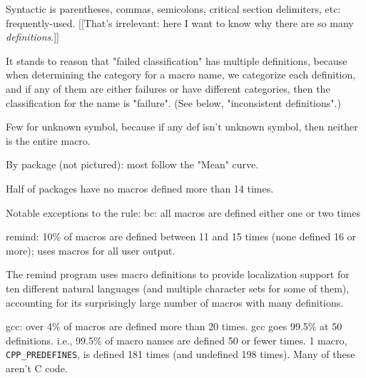 \documentclass[10pt]{article}
\newcommand{\pkg}[1]{\textsf{#1}}
\begin{document}
        Syntactic is parentheses, commas, semicolons, critical section
          delimiters, etc:  frequently-used.  [[That's irrelevant:  here I
          want to know why there are so many {\em definitions}.]]

        It stands to reason that "failed classification" has multiple
          definitions, because when determining the category for a macro
          name, we categorize each definition, and if any of them are
          either failures or have different categories, then the classification
          for the name is "failure".  (See below, "inconsistent definitions".)

        Few for unknown symbol, because if any def isn't unknown symbol,
          then neither is the entire macro.

        By package (not pictured):  most follow the "Mean" curve.

          Half of packages have no macros defined more than 14 times.

          Notable exceptions to the rule:
            \pkg{bc}:  all macros are defined either one or two times

            \pkg{remind}:  10\% of macros are defined between 11 and 15 times
                (none defined 16 or more); uses macros for all user output.
                
                The \pkg{remind} program uses macro definitions to provide
                localization support for ten different natural languages
                (and multiple character sets for some of them), accounting
                for its surprisingly large number of macros with many
                definitions.

            \pkg{gcc}: over 4\% of macros are defined more than 20 times.
                gcc goes 99.5\% at 50 definitions.
                i.e., 99.5\% of macro names are defined 50 or fewer times.
                1 macro, \verb|CPP_PREDEFINES|, is defined 181 times (and undefined
                  198 times).
                Many of these aren't C code.

        \label{sec:usage}

\end{document}
